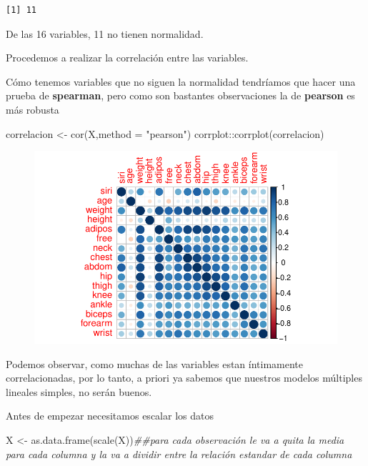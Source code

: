 \documentclass[
  letterpaper,
  DIV=11,
  numbers=noendperiod]{scrartcl}
\newenvironment{Shaded}{\begin{snugshade}}{\end{snugshade}}
\newcommand{\AttributeTok}[1]{\textcolor[rgb]{0.40,0.45,0.13}{#1}}
\newcommand{\DocumentationTok}[1]{\textcolor[rgb]{0.37,0.37,0.37}{\textit{#1}}}
\newcommand{\FunctionTok}[1]{\textcolor[rgb]{0.28,0.35,0.67}{#1}}
\newcommand{\NormalTok}[1]{\textcolor[rgb]{0.00,0.23,0.31}{#1}}
\newcommand{\OtherTok}[1]{\textcolor[rgb]{0.00,0.23,0.31}{#1}}
\newcommand{\SpecialCharTok}[1]{\textcolor[rgb]{0.37,0.37,0.37}{#1}}
\newcommand{\StringTok}[1]{\textcolor[rgb]{0.13,0.47,0.30}{#1}}
\begin{document}
\begin{verbatim}
[1] 11
\end{verbatim}

De las 16 variables, 11 no tienen normalidad.

Procedemos a realizar la correlación entre las variables.

Cómo tenemos variables que no siguen la normalidad tendríamos que hacer
una prueba de \textbf{spearman}, pero como son bastantes observaciones
la de \textbf{pearson} es más robusta

\begin{Shaded}
\begin{Highlighting}[]
\NormalTok{correlacion }\OtherTok{\textless{}{-}} \FunctionTok{cor}\NormalTok{(X,}\AttributeTok{method =} \StringTok{"pearson"}\NormalTok{)}
\NormalTok{corrplot}\SpecialCharTok{::}\FunctionTok{corrplot}\NormalTok{(correlacion)}
\end{Highlighting}
\end{Shaded}

\begin{figure}[H]

{\centering \includegraphics{Regularizacion_files/figure-pdf/unnamed-chunk-4-1.pdf}

}

\end{figure}

Podemos observar, como muchas de las variables estan íntimamente
correlacionadas, por lo tanto, a priori ya sabemos que nuestros modelos
múltiples lineales simples, no serán buenos.

Antes de empezar necesitamos escalar los datos

\begin{Shaded}
\begin{Highlighting}[]
\NormalTok{X }\OtherTok{\textless{}{-}} \FunctionTok{as.data.frame}\NormalTok{(}\FunctionTok{scale}\NormalTok{(X))}\DocumentationTok{\#\#para cada observación le va a quita la media para cada columna y la va a dividir entre la relación estandar de cada columna }
\end{Highlighting}
\end{Shaded}
\end{document}
